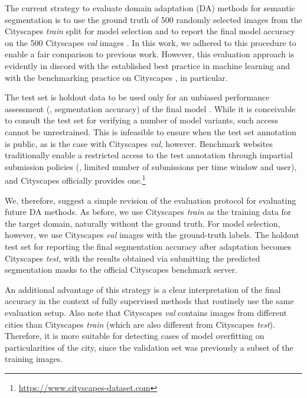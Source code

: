 
The current strategy to evaluate domain adaptation (DA) methods for semantic segmentation is to use the ground truth of \num{500} randomly selected images from the Cityscapes \textit{train} split for model selection and to report the final model accuracy on the \num{500} Cityscapes \textit{val} images \cite{LianDLG19}.
In this work, we adhered to this procedure to enable a fair comparison to previous work.
However, this evaluation approach is evidently in discord with the established best practice in machine learning and with the benchmarking practice on Cityscapes \cite{CordtsORREBFRS16}, in particular.

The test set is holdout data to be used only for an unbiased performance assessment (\eg, segmentation accuracy) of the final model .
While it is conceivable to consult the test set for verifying a number of model variants, such access cannot be unrestrained.
This is infeasible to ensure when the test set annotation is public, as is the case with Cityscapes \textit{val}, however.
Benchmark websites traditionally enable a restricted access to the test annotation through impartial submission policies (\eg, limited number of submissions per time window and user), and Cityscapes officially provides one.\footnote{\url{https://www.cityscapes-dataset.com}}

We, therefore, suggest a simple revision of the evaluation protocol for evaluating future DA methods.
As before, we use Cityscapes \textit{train} as the training data for the target domain, naturally without the ground truth.
For model selection, however, we use Cityscapes \textit{val} images with the ground-truth labels.
The holdout test set for reporting the final segmentation accuracy after adaptation becomes Cityscapes \textit{test}, with the results obtained via submitting the predicted segmentation masks to the official Cityscapes benchmark server.

An additional advantage of this strategy is a clear interpretation of the final accuracy in the context of fully supervised methods that routinely use the same evaluation setup.
Also note that Cityscapes \textit{val} contains images from different cities than Cityscapes \textit{train} (which are also different from Cityscapes \textit{test}).
Therefore, it is more suitable for detecting cases of model overfitting on particularities of the city, since the validation set was previously a subset of the training images.

